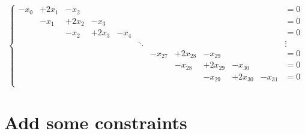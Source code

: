 \documentclass[notitlepage]{report}
\begin{document}
\begin{equation}
\nonumber
\left\{
\begin{array}{cccccccccccl}
-x_0 & +2x_1 & -x_2  &       &      &        &         &          &          &          &         &= 0 \\
     & -x_1  & +2x_2 & -x_3  &      &        &         &          &          &          &         &= 0 \\
     &       & -x_2  & +2x_3 & -x_4 &        &         &          &          &          &         &= 0 \\
     &       &       &       &      & \ddots &         &          &          &          &         &  \vdots \\
     &       &       &       &      &        & -x_{27} & +2x_{28} & -x_{29}  &          &         &= 0 \\
     &       &       &       &      &        &         & -x_{28}  & +2x_{29} & -x_{30}  &         &= 0 \\
     &       &       &       &      &        &         &          & -x_{29}  & +2x_{30} & -x_{31} &= 0 \\
\end{array}
\right.
\end{equation}


\section{Add some constraints}
\inputminted[frame=single,linenos=true]{python}{lst_linsys02.py}
\end{document}
